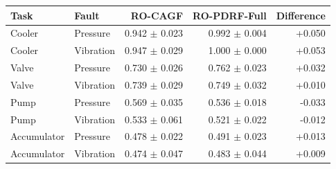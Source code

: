 \begin{tabular}{llrrr}
\toprule
Task & Fault & RO-CAGF & RO-PDRF-Full & Difference \\
\midrule
Cooler & Pressure & 0.942 $\pm$ 0.023 & 0.992 $\pm$ 0.004 & +0.050 \\
Cooler & Vibration & 0.947 $\pm$ 0.029 & 1.000 $\pm$ 0.000 & +0.053 \\
Valve & Pressure & 0.730 $\pm$ 0.026 & 0.762 $\pm$ 0.023 & +0.032 \\
Valve & Vibration & 0.739 $\pm$ 0.029 & 0.749 $\pm$ 0.032 & +0.010 \\
Pump & Pressure & 0.569 $\pm$ 0.035 & 0.536 $\pm$ 0.018 & -0.033 \\
Pump & Vibration & 0.533 $\pm$ 0.061 & 0.521 $\pm$ 0.022 & -0.012 \\
Accumulator & Pressure & 0.478 $\pm$ 0.022 & 0.491 $\pm$ 0.023 & +0.013 \\
Accumulator & Vibration & 0.474 $\pm$ 0.047 & 0.483 $\pm$ 0.044 & +0.009 \\
\bottomrule
\end{tabular}